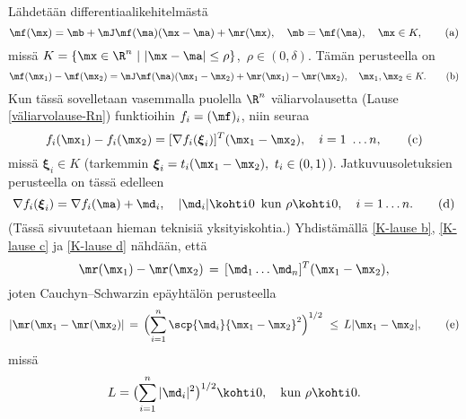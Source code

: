 Lähdetään differentiaalikehitelmästä
\begin{equation} \label{K-lause a}
\mf(\mx)=\mb+\mJ\mf(\ma)(\mx-\ma)+\mr(\mx), \quad \mb=\mf(\ma), \quad \mx\in K, \tag{a}
\end{equation}
missä $K=\{\mx\in\R^n \ | \ |\mx-\ma|\le\rho\}$, $\,\rho\in(0,\delta)$. Tämän perusteella on
\begin{equation} \label{K-lause b}
\mf(\mx_1)-\mf(\mx_2)=\mJ\mf(\ma)(\mx_1-\mx_2)+\mr(\mx_1)-\mr(\mx_2), \quad
                                                  \mx_1,\mx_2 \in K. \tag{b}
\end{equation}
Kun tässä sovelletaan vasemmalla puolella $\R^n$ väliarvolausetta
(Lause \ref{väliarvolause-Rn})  funktioihin $f_i=(\mf)_i$, niin seuraa
\begin{equation} \label{K-lause c}
f_i(\mx_1)-f_i(\mx_2) = [\nabla f_i(\boldsymbol{\xi}_i)]^T(\mx_1-\mx_2),
                                                     \quad i=1 \ldots n, \tag{c}
\end{equation}
missä $\boldsymbol{\xi}_i\in K$ (tarkemmin $\boldsymbol{\xi}_i=t_i(\mx_1-\mx_2),\ t_i\in(0,1)$).
Jatkuvuusoletuksien perusteella on tässä edelleen
\begin{equation} \label{K-lause d}
\nabla f_i(\boldsymbol{\xi}_i) = \nabla f_i(\ma)+\md_i, \quad |\md_i| \kohti 0 \,\ 
                                 \text{kun}\ \rho \kohti 0, \quad i = 1 \ldots n. \tag{d}
\end{equation}
(Tässä sivuutetaan hieman teknisiä yksityiskohtia.) Yhdistämällä \eqref{K-lause b},
\eqref{K-lause c} ja \eqref{K-lause d} nähdään, että
\[
\mr(\mx_1)-\mr(\mx_2)\,          =\,[\md_1 \ldots \md_n]^T(\mx_1-\mx_2),%
\]
joten Cauchyn--Schwarzin epäyhtälön perusteella
\begin{equation} \label{K-lause e}
|\mr(\mx_1-\mr(\mx_2)| \,=\, \Bigl(\sum_{i=1}^n\scp{\md_i}{\mx_1-\mx_2}^2\Bigr)^{1/2}\,
                       \,\le\,L|\mx_1-\mx_2|, \tag{e}
\end{equation}
missä
\[
L=\bigl(\sum_{i=1}^n|\md_i|^2\bigr)^{1/2} \kohti 0, \quad \text{kun}\ \rho \kohti 0.
\]

